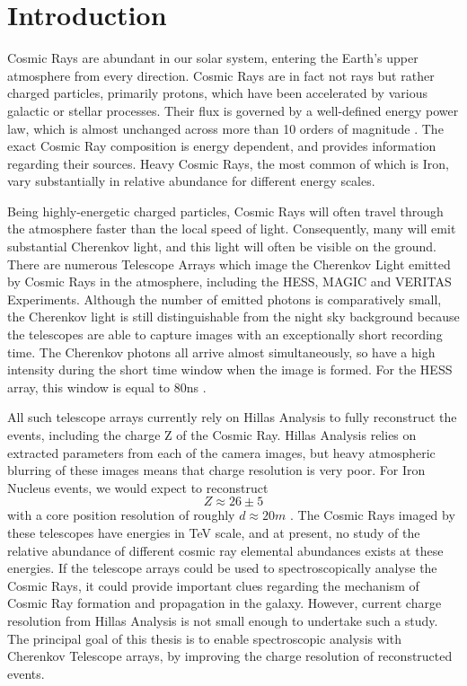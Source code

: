 \documentclass[11pt]{article}
\begin{document}
\section{Introduction}
Cosmic Rays are abundant in our solar system, entering the Earth's upper atmosphere from every direction. Cosmic Rays are in fact not rays but rather charged particles, primarily protons, which have been accelerated by various galactic or stellar processes. Their flux is governed by a well-defined energy power law, which is almost unchanged across more than 10 orders of magnitude \cite{Blasi:2013rva}.  The exact Cosmic Ray composition is energy dependent, and provides information regarding their sources. Heavy Cosmic Rays, the most common of which is Iron, vary substantially in relative abundance for different energy scales.

Being highly-energetic charged particles, Cosmic Rays will often travel through the atmosphere faster than the local speed of light. Consequently, many will emit substantial Cherenkov light, and this light will often be visible on the ground. There are numerous Telescope Arrays which image the Cherenkov Light emitted by Cosmic Rays in the atmosphere, including the HESS, MAGIC and VERITAS Experiments. Although the number of emitted photons is comparatively small, the Cherenkov light is still distinguishable from the night sky background because the telescopes are able to capture images with an exceptionally short recording time. The Cherenkov photons all arrive almost simultaneously, so have a high intensity during the short time window when the image is formed. For the HESS array, this window is equal to 80ns \cite{Funk:2004ie}.

All such telescope arrays currently rely on Hillas Analysis to fully reconstruct the events, including the  charge Z of the Cosmic Ray. Hillas Analysis relies on extracted parameters from each of the camera images, but heavy atmospheric blurring of these images means that charge resolution is very poor. For Iron Nucleus events, we would expect to reconstruct \[Z \approx 26 \pm 5 \] with a core position resolution of roughly $d \approx 20 m $ \cite{hess07}. The Cosmic Rays imaged by these telescopes have energies in TeV scale, and at present, no study of the relative abundance of different cosmic ray elemental abundances exists at these energies. If the telescope arrays could be used to spectroscopically analyse the Cosmic Rays, it could provide important clues regarding the mechanism of Cosmic Ray formation and propagation in the galaxy. However, current charge resolution from Hillas Analysis is not small enough to undertake such a study. The principal goal of this thesis is to enable spectroscopic analysis with Cherenkov Telescope arrays, by improving the charge resolution of reconstructed events.
\end{document}
